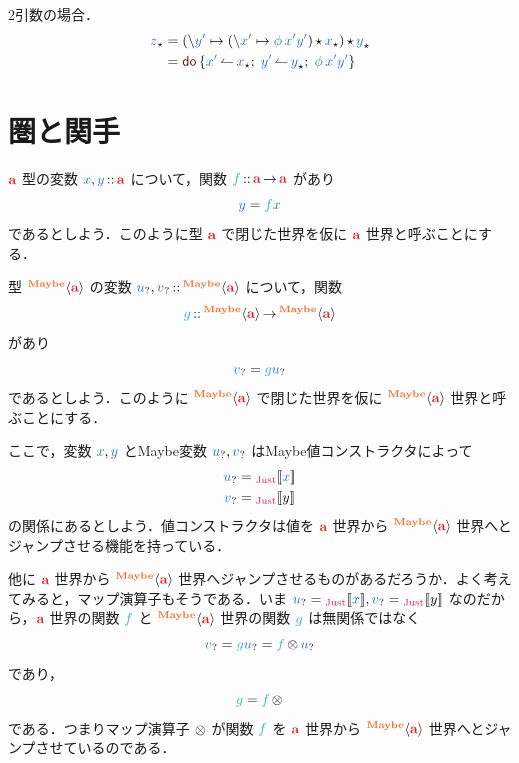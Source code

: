 \documentclass[a5paper,twoside,fleqn,draft]{jsbook}
\begin{document}
2引数の場合．
\begin{align*}
\hAnyContextVar{z}
&=(\hLambdaSyntax{\hVar{y'}}{(\hLambdaSyntax{\hVar{x'}}{\hAction{\phi}\hVar{x'}\hVar{y'}})\hMonadicBind\hAnyContextVar{x}})\hMonadicBind\hAnyContextVar{y}\\
&=\hDoSyntax{\hVar{x'}\hDoArrow\hAnyContextVar{x};\;
\hVar{y'}\hDoArrow\hAnyContextVar{y};\;
\hAction{\phi}\hVar{x'}\hVar{y'}}
\end{align*}


\section{圏と関手}

$\hTypeName{a}$ 型の変数 $\hVar{x},\hVar{y}\hIsTypeOf\hTypeName{a}$ について，関数 $\hFunc{f}\hIsTypeOf\hTypeName{a}\hFunctionArrow\hTypeName{a}$ があり
\begin{equation}
  \hVar{y}
  =\hFunc{f}\hVar{x}
\end{equation}
であるとしよう．このように型 $\hTypeName{a}$ で閉じた世界を仮に $\hTypeName{a}$ 世界と呼ぶことにする．

型 $\hMaybeConstruct{\hTypeName{a}}$ の変数 $\hMaybeVar{u},\hMaybeVar{v}\hIsTypeOf\hMaybeConstruct{\hTypeName{a}}$ について，関数
\begin{equation}
  \hFunc{g}
  \hIsTypeOf\hMaybeConstruct{\hTypeName{a}}\hFunctionArrow\hMaybeConstruct{\hTypeName{a}}
\end{equation}
があり
\begin{equation}
  \hMaybeVar{v}
  =\hFunc{g}\hMaybeVar{u}
\end{equation}
であるとしよう．このように $\hMaybeConstruct{\hTypeName{a}}$ で閉じた世界を仮に $\hMaybeConstruct{\hTypeName{a}}$ 世界と呼ぶことにする．

ここで，変数 $\hVar{x},\hVar{y}$ とMaybe変数 $\hMaybeVar{u},\hMaybeVar{v}$ はMaybe値コンストラクタによって
\begin{align}
  \hMaybeVar{u}
  &=\hJustWith{\hVar{x}}\\
  \hMaybeVar{v}
  &=\hJustWith{y}
\end{align}
の関係にあるとしよう．値コンストラクタは値を $\hTypeName{a}$ 世界から $\hMaybeConstruct{\hTypeName{a}}$ 世界へとジャンプさせる機能を持っている．

他に $\hTypeName{a}$ 世界から $\hMaybeConstruct{\hTypeName{a}}$ 世界へジャンプさせるものがあるだろうか．よく考えてみると，マップ演算子もそうである．いま $\hMaybeVar{u}=\hJustWith{\hVar{x}},\hMaybeVar{v}=\hJustWith{y}$ なのだから，$\hTypeName{a}$ 世界の関数 $\hFunc{f}$ と $\hMaybeConstruct{\hTypeName{a}}$ 世界の関数 $\hFunc{g}$ は無関係ではなく
\begin{equation}
  \hMaybeVar{v}
  =\hFunc{g}\hMaybeVar{u}
  =\hFunc{f}\hMaybeMap\hMaybeVar{u}
\end{equation}
であり，
\begin{equation}
  \hFunc{g}
  =\hFunc{f}\hMaybeMap
\end{equation}
である．つまりマップ演算子 $\operatorname{\otimes}$ が関数 $\hFunc{f}$ を $\hTypeName{a}$ 世界から $\hMaybeConstruct{\hTypeName{a}}$ 世界へとジャンプさせているのである．
\end{document}
